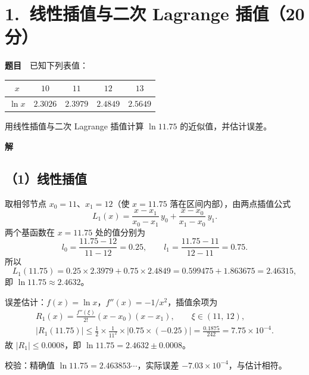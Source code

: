 \documentclass[a4paper,11pt]{ctexart}
\begin{document}
\section*{1.\ 线性插值与二次 Lagrange 插值（20分）}

\textbf{题目}　已知下列表值：
\begin{center}
  \begin{tabular}{ccccc}
    \toprule
    $x$      & $10$     & $11$     & $12$     & $13$     \\
    \midrule
    $\ln x$  & $2.3026$ & $2.3979$ & $2.4849$ & $2.5649$ \\
    \bottomrule
  \end{tabular}
\end{center}
用线性插值与二次 Lagrange 插值计算 $\ln 11.75$ 的近似值，并估计误差。

\textbf{解}

\subsection*{（1）线性插值}
取相邻节点 $x_0=11$、$x_1=12$（使 $x=11.75$ 落在区间内部），由两点插值公式
\[
  L_1(x)=\frac{x-x_1}{x_0-x_1}\,y_0+\frac{x-x_0}{x_1-x_0}\,y_1 .
\]
两个基函数在 $x=11.75$ 处的值分别为
\[
  l_0=\frac{11.75-12}{11-12}=0.25,\qquad
  l_1=\frac{11.75-11}{12-11}=0.75 .
\]
所以
\[
  L_1(11.75)=0.25\times 2.3979+0.75\times 2.4849
  =0.599475+1.863675=2.46315 ,
\]
即 $\ln 11.75\approx 2.4632$。

误差估计：$f(x)=\ln x$，$f''(x)=-1/x^{2}$，插值余项为
\begin{gather*}
  R_1(x)=\frac{f''(\xi)}{2!}(x-x_0)(x-x_1),\qquad \xi\in(11,\,12),\\
  |R_1(11.75)|\le \frac{1}{2}\times\frac{1}{11^{2}}\times\bigl|0.75\times(-0.25)\bigr|
  =\frac{0.1875}{242}=7.75\times 10^{-4}.
\end{gather*}
故 $|R_1|\le 0.0008$，即 $\ln 11.75=2.4632\pm 0.0008$。

{\small 校验：精确值 $\ln 11.75=2.463853\cdots$，实际误差 $-7.03\times10^{-4}$，与估计相符。}
\end{document}
